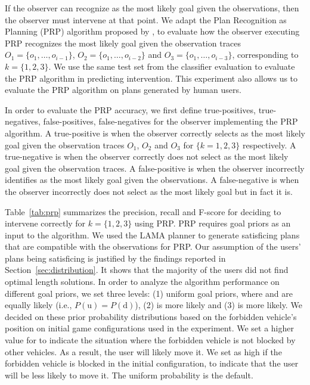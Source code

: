 If the observer can recognize \undesired as the most likely goal given the observations, then the observer must intervene at that point.
We adapt the Plan Recognition as Planning (PRP) algorithm proposed by \cite{ramirez2010probabilistic}, to evaluate how the observer
executing PRP recognizes the most likely goal given the observation traces $O_1=\lbrace o_1, \ldots, o_{i-1}\rbrace$, $O_2=\lbrace o_1, \ldots, o_{i-2}\rbrace$ and $O_3=\lbrace o_1, \ldots, o_{i-3}\rbrace$, corresponding to $k=\lbrace 1,2,3\rbrace$.
We use the same test set from the classifier evaluation to evaluate the PRP algorithm in predicting intervention.
This experiment also allows us to evaluate the PRP algorithm on plans generated by human users.

In order to evaluate the PRP accuracy, we first define true-positives, true-negatives, false-positives, false-negatives for the observer implementing the PRP algorithm. 
A true-positive is when the observer correctly selects \undesired as the most likely goal given the observation traces $O_1$, $O_2$ and $O_3$ for $\lbrace k=1,2,3\rbrace$ respectively.
A true-negative is when the observer correctly does not select \undesired as the most likely goal given the observation traces. 
A false-positive is when the observer incorrectly identifies \undesired as the most likely goal given the observations. 
A false-negative is when the observer incorrectly does not select \undesired as the most likely goal but in fact it is.

Table~\ref{tab:prp} summarizes the precision, recall and F-score for deciding to intervene correctly for $k=\lbrace 1,2,3\rbrace$ using PRP. 
PRP requires goal priors as an input to the algorithm. 
We used the LAMA planner \cite{richterWestphal10.jair.LAMA} to generate satisficing plans that are compatible with the observations for PRP. 
Our assumption of the users' plans being satisficing is justified by the findings reported in Section~\ref{sec:distribution}. 
It shows that the majority of the users did not find optimal length solutions.
In order to analyze the algorithm performance on different goal priors, we set three levels: (1) uniform goal priors, where \undesired and \desired are equally likely (i.e., $P(\mathrm{u})=P(\mathrm{d})$), (2) \undesired is more likely and (3) \desired is more likely. 
We decided on these prior probability distributions based on the forbidden vehicle's position on initial game configurations used in the experiment. 
We set a higher value for \undesired to indicate the situation where the forbidden vehicle is not blocked by other vehicles. 
As a result, the user will likely move it. 
We set \desired as high if the forbidden vehicle is blocked in the initial configuration, to indicate that the user will be less likely to move it. 
The uniform probability is the default.

